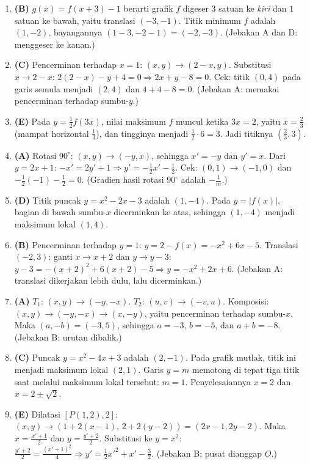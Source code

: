 \documentclass[a4paper,11pt]{article}
\begin{document}
\small\begin{enumerate}[leftmargin=2em,itemsep=2pt,topsep=2pt]
\item[\textbf{1.}] \textbf{(B)} $g(x)=f(x+3)-1$ berarti grafik $f$ digeser $3$ satuan ke \emph{kiri} dan $1$ satuan ke bawah, yaitu translasi $(-3,-1)$. Titik minimum $f$ adalah $(1,-2)$, bayangannya $(1-3,-2-1)=(-2,-3)$. (Jebakan A dan D: menggeser ke kanan.)
\item[\textbf{2.}] \textbf{(C)} Pencerminan terhadap $x=1$: $(x,y)\to(2-x,y)$. Substitusi $x\to2-x$: $2(2-x)-y+4=0\Rightarrow2x+y-8=0$. Cek: titik $(0,4)$ pada garis semula menjadi $(2,4)$ dan $4+4-8=0$. (Jebakan A: memakai pencerminan terhadap sumbu-$y$.)
\item[\textbf{3.}] \textbf{(E)} Pada $y=\frac12f(3x)$, nilai maksimum $f$ muncul ketika $3x=2$, yaitu $x=\frac23$ (mampat horizontal $\frac13$), dan tingginya menjadi $\frac12\cdot6=3$. Jadi titiknya $\left(\frac23,3\right)$.
\item[\textbf{4.}] \textbf{(A)} Rotasi $90^\circ$: $(x,y)\to(-y,x)$, sehingga $x'=-y$ dan $y'=x$. Dari $y=2x+1$: $-x'=2y'+1\Rightarrow y'=-\frac12x'-\frac12$. Cek: $(0,1)\to(-1,0)$ dan $-\frac12(-1)-\frac12=0$. (Gradien hasil rotasi $90^\circ$ adalah $-\frac1m$.)
\item[\textbf{5.}] \textbf{(D)} Titik puncak $y=x^2-2x-3$ adalah $(1,-4)$. Pada $y=|f(x)|$, bagian di bawah sumbu-$x$ dicerminkan ke atas, sehingga $(1,-4)$ menjadi maksimum lokal $(1,4)$.
\item[\textbf{6.}] \textbf{(B)} Pencerminan terhadap $y=1$: $y=2-f(x)=-x^2+6x-5$. Translasi $(-2,3)$: ganti $x\to x+2$ dan $y\to y-3$: $y-3=-(x+2)^2+6(x+2)-5\Rightarrow y=-x^2+2x+6$. (Jebakan A: translasi dikerjakan lebih dulu, lalu dicerminkan.)
\item[\textbf{7.}] \textbf{(A)} $T_1$: $(x,y)\to(-y,-x)$. $T_2$: $(u,v)\to(-v,u)$. Komposisi: $(x,y)\to(-y,-x)\to(x,-y)$, yaitu pencerminan terhadap sumbu-$x$. Maka $(a,-b)=(-3,5)$, sehingga $a=-3$, $b=-5$, dan $a+b=-8$. (Jebakan B: urutan dibalik.)
\item[\textbf{8.}] \textbf{(C)} Puncak $y=x^2-4x+3$ adalah $(2,-1)$. Pada grafik mutlak, titik ini menjadi maksimum lokal $(2,1)$. Garis $y=m$ memotong di tepat tiga titik saat melalui maksimum lokal tersebut: $m=1$. Penyelesaiannya $x=2$ dan $x=2\pm\sqrt2$.
\item[\textbf{9.}] \textbf{(E)} Dilatasi $[P(1,2),2]$: $(x,y)\to(1+2(x-1),\,2+2(y-2))=(2x-1,2y-2)$. Maka $x=\frac{x'+1}2$ dan $y=\frac{y'+2}2$. Substitusi ke $y=x^2$: $\frac{y'+2}2=\frac{(x'+1)^2}4\Rightarrow y'=\frac12x'^2+x'-\frac32$. (Jebakan B: pusat dianggap $O$.)

\end{enumerate}
\end{document}
